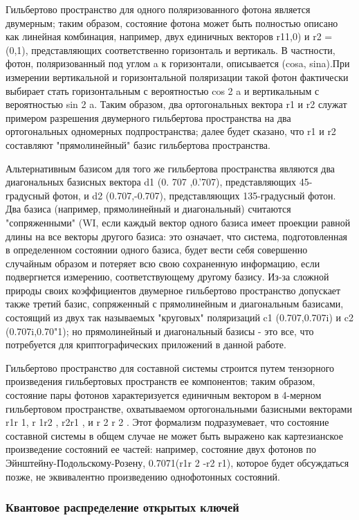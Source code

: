 ­­Гильбертово пространство для одного поляризованного фотона является двумерным; таким образом, состояние фотона может быть полностью описано как линейная комбинация, например, двух единичных векторов r11,0) и r2 = (0,1), представляющих соответственно горизонталь и вертикаль. В частности, фотон, поляризованный под углом a к горизонтали, описывается (cosa, sina).При измерении вертикальной и горизонтальной поляризации такой фотон фактически выбирает стать горизонтальным с вероятностью cos 2 a и вертикальным с вероятностью sin 2 a. Таким образом, два ортогональных вектора r1 и r2 служат примером разрешения двумерного гильбертова пространства на два ортогональных одномерных подпространства; далее будет сказано, что r1 и r2 составляют "прямолинейный" базис гильбертова пространства.

­­Альтернативным базисом для того же гильбертова пространства являются два диагональных базисных вектора d1 (0. 707 ,0.'707), представляющих 45-градусный фотон, и d2 (0.707,-0.707), представляющих 135-градусный фотон. Два базиса (например, прямолинейный и диагональный) считаются "сопряженными" (WI, если каждый вектор одного базиса имеет проекции равной длины на все векторы другого базиса: это означает, что система, подготовленная в определенном состоянии одного базиса, будет вести себя совершенно случайным образом и потеряет всю свою сохраненную информацию, если подвергнется измерению, соответствующему другому базису. Из-за сложной природы своих коэффициентов двумерное гильбертово пространство допускает также третий базис, сопряженный с прямолинейным и диагональным базисами, состоящий из двух так называемых "круговых" поляризаций c1 (0.707,0.707i) и c2 (0.707i,0.70"1); но прямолинейный и диагональный базисы - это все, что потребуется для криптографических приложений в данной работе.

­­Гильбертово пространство для составной системы строится путем тензорного произведения гильбертовых пространств ее компонентов; таким образом, состояние пары фотонов характеризуется единичным вектором в 4-мерном гильбертовом пространстве, охватываемом ортогональными базисными векторами r1r 1, r 1r2 , r2r1 , и r 2 r 2 . Этот формализм подразумевает, что состояние составной системы в общем случае не может быть выражено как картезианское произведение состояний ее частей: например, состояние двух фотонов по Эйнштейну-Подольскому-Розену, 0.7071(r1r 2 -r2 r1), которое будет обсуждаться позже, не эквивалентно произведению однофотонных состояний.

\subsubsection{Квантовое распределение открытых ключей}

